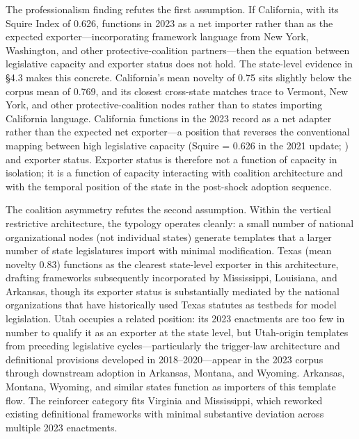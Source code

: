 The professionalism finding refutes the first assumption. If California, with its Squire Index of 0.626, functions in 2023 as a net importer rather than as the expected exporter---incorporating framework language from New York, Washington, and other protective-coalition partners---then the equation between legislative capacity and exporter status does not hold. The state-level evidence in §4.3 makes this concrete. California's mean novelty of 0.75 sits slightly below the corpus mean of 0.769, and its closest cross-state matches trace to Vermont, New York, and other protective-coalition nodes rather than to states importing California language. California functions in the 2023 record as a net adapter rather than the expected net exporter—a position that reverses the conventional mapping between high legislative capacity (Squire = 0.626 in the 2021 update; \parencite{squireSquireIndexUpdate2024}) and exporter status. Exporter status is therefore not a function of capacity in isolation; it is a function of capacity interacting with coalition architecture and with the temporal position of the state in the post-shock adoption sequence.
 
The coalition asymmetry refutes the second assumption. Within the vertical restrictive architecture, the typology operates cleanly: a small number of national organizational nodes (not individual states) generate templates that a larger number of state legislatures import with minimal modification. Texas (mean novelty 0.83) functions as the clearest state-level exporter in this architecture, drafting frameworks subsequently incorporated by Mississippi, Louisiana, and Arkansas, though its exporter status is substantially mediated by the national organizations that have historically used Texas statutes as testbeds for model legislation. Utah occupies a related position: its 2023 enactments are too few in number to qualify it as an exporter at the state level, but Utah-origin templates from preceding legislative cycles—particularly the trigger-law architecture and definitional provisions developed in 2018–2020—appear in the 2023 corpus through downstream adoption in Arkansas, Montana, and Wyoming. Arkansas, Montana, Wyoming, and similar states function as importers of this template flow. The reinforcer category fits Virginia and Mississippi, which reworked existing definitional frameworks with minimal substantive deviation across multiple 2023 enactments.
 
